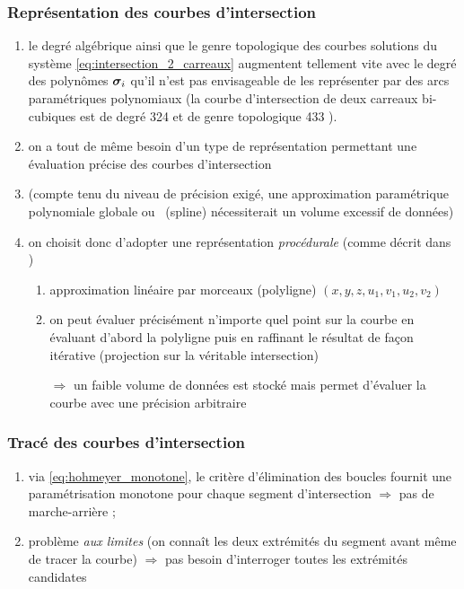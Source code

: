 \subsubsection{Représentation des courbes d'intersection}
\begin{enumerate}
	\item le degré algébrique ainsi que le genre topologique des courbes solutions du système \eqref{eq:intersection_2_carreaux} augmentent tellement vite avec le degré des polynômes $\bm{\sigma}_i$ qu'il n'est pas envisageable de les représenter par des arcs paramétriques polynomiaux (\eg la courbe d'intersection de deux carreaux bi-cubiques est de degré 324 et de genre topologique 433 \cite{katz1988}).
	\item on a tout de même besoin d'un type de représentation permettant une évaluation précise des courbes d'intersection
	\item (compte tenu du niveau de précision exigé, une approximation paramétrique polynomiale globale ou \piecewise\ (spline) nécessiterait un volume excessif de données)
	\item on choisit donc d'adopter une représentation \textit{procédurale} (comme décrit dans \cite{hohmeyer1992})
	\begin{enumerate}
		\item approximation linéaire par morceaux (polyligne) $(x,y,z,u_1,v_1,u_2,v_2)$
		\item on peut évaluer précisément n'importe quel point sur la courbe en évaluant d'abord la polyligne puis en raffinant le résultat de façon itérative (projection sur la véritable intersection)
		\item[$\Rightarrow$] un faible volume de données est stocké mais permet d'évaluer la courbe avec une précision arbitraire
	\end{enumerate}
\end{enumerate}
	
	
\subsubsection{Tracé des courbes d'intersection}
\label{trace_courbes_intersection}
\begin{enumerate}
	\item via \eqref{eq:hohmeyer_monotone}, le critère d'élimination des boucles fournit une paramétrisation monotone pour chaque segment d'intersection $\Rightarrow$ pas de marche-arrière ;
	\item problème \textit{aux limites} (on connaît les deux extrémités du segment avant même de tracer la courbe) $\Rightarrow$ pas besoin d'interroger toutes les extrémités candidates
\end{enumerate}


